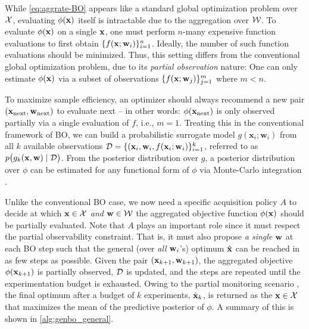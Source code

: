 While \eqref{eq:aggrate-BO} appears like a standard global optimization problem over \({\mathcal{X}}\), evaluating \(\phi({\mathbf{x}})\) itself is intractable due to the aggregation over \({\mathcal{W}}\).
To evaluate \(\phi({\mathbf{x}})\) on a single \({\mathbf{x}}\), one must perform \(n\)-many expensive function evaluations to first obtain \(\{ f({\mathbf{x}}; {\mathbf{w}}_i) \}_{i=1}^n\).
Ideally, the number of such function evaluations should be minimized.
Thus, this setting differs from the conventional global optimization problem, due to its \emph{partial observation} nature:
One can only estimate \(\phi({\mathbf{x}})\) via a subset of observations \(\{ f({\mathbf{x}}; {\mathbf{w}}_j )\}_{j=1}^m\) where \(m < n\).

To maximize sample efficiency, an optimizer should always recommend a new pair $({\mathbf{x}}_\text{next}, {\mathbf{w}}_\text{next})$ to evaluate next -- in other words: $\phi({\mathbf{x}}_{\text{next}})$ is only observed partially via a single evaluation of \(f\), i.e., \(m = 1\).
Treating this in the conventional framework of BO, we can build a probabilistic surrogate model $g(\mathbf{x}_i; \mathbf{w}_i)$ from all $k$ available observations ${\mathcal{D}} = \{(\mathbf{x}_i, \mathbf{w}_i, f(\mathbf{x}_i; \mathbf{w}_i)\}_{i=1}^k$, referred to as $p\big(g_k ({\mathbf{x}}, {\mathbf{w}}) \mid \mathcal{D}\big)$. 
From the posterior distribution over $g$, a posterior distribution over $\phi$ can be estimated for any functional form of $\phi$ via Monte-Carlo integration \citep[see \cref{App:acqf} for further details;][]{balandat_botorch_2020}. 

Unlike the conventional BO case, we now need a specific acquisition policy $A$ to decide at which ${\mathbf{x}} \in {\mathcal{X}}$ \emph{and} ${\mathbf{w}} \in {\mathcal{W}}$ the aggregated objective function \(\phi({\mathbf{x}})\) should be partially evaluated.
Note that \(A\) plays an important role since it must respect the partial observability constraint.
That is, it must also propose \emph{a single} \({\mathbf{w}}\) at each BO step such that the general (over \emph{all} \({\mathbf{w}}_i\)'s) optimum \(\hat{{\mathbf{x}}}\) can be reached in as few steps as possible.
Given the pair $({\mathbf{x}}_{k+1},{\mathbf{w}}_{k+1})$, the aggregated objective \(\phi({\mathbf{x}}_{k+1})\) is partially observed, ${\mathcal{D}}$ is updated, and the steps are repeated until the experimentation budget is exhausted.
Owing to the partial monitoring scenario \citep{rustichini_minimizing_1999, lattimore_cleaning_2019, lattimore_bandit_2020}, the final optimum after a budget of $k$ experiments, $\hat{{\mathbf{x}}}_k$, is returned as the ${\mathbf{x}} \in {\mathcal{X}}$ that maximizes the mean of the predictive posterior of $\phi$.
A summary of this is shown in \cref{alg:genbo_general}.

